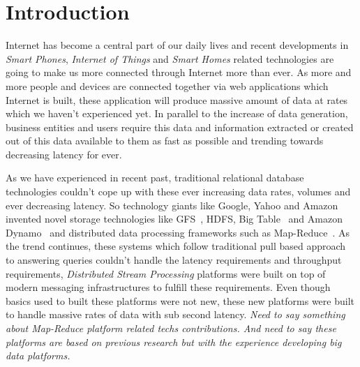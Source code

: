 \documentclass{sig-alternate}
\begin{document}


\section{Introduction}
Internet has become a central part of our daily lives and recent developments in
\textit{Smart Phones}, \textit{Internet of Things} and \textit{Smart Homes} related
technologies are going to make us more connected through Internet more than ever.
As more and more people and devices are connected together via web applications which
Internet is built, these application will produce massive amount of data at rates which
we haven't experienced yet. In parallel to the increase of data generation, business
entities and users require this data and information extracted or created out of this data
available to them as fast as possible and trending towards decreasing latency for ever.

\begin{sloppypar}
As we have experienced in recent past, traditional relational database
technologies couldn't
cope up with these ever increasing data rates, volumes and ever decreasing latency. So technology
giants like Google, Yahoo and Amazon invented  novel storage
technologies like GFS~\cite{ghemawat2003google}, HDFS, Big Table~\cite{chang2008bigtable} and
Amazon Dynamo~\cite{decandia2007dynamo} and distributed data processing frameworks such as Map-Reduce~\cite{dean2010mapreduce}.
As the trend continues, these systems which follow traditional pull based approach
to answering queries couldn't handle the latency requirements and throughput requirements,
\textit{Distributed Stream Processing} platforms were built on top of modern messaging
infrastructures to fulfill these requirements. Even though basics used
to built these platforms were  not new, these new
platforms were built to handle massive rates of data with sub second latency. \textit{Need to say
 something about Map-Reduce platform related techs contributions. And
 need to say these platforms are based on previous research but with
 the experience developing big data platforms.}
\end{sloppypar}

\end{document}
